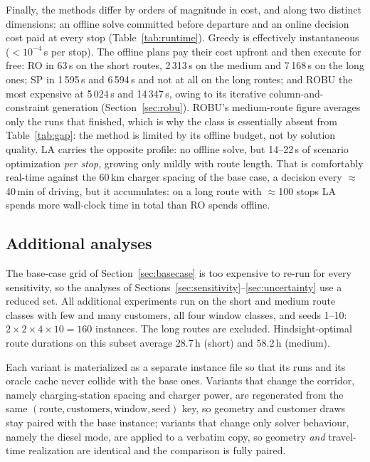Finally, the methods differ by orders of magnitude in cost, and along two
distinct dimensions: an offline solve committed before departure and an online
decision cost paid at every stop (Table~\ref{tab:runtime}).  Greedy is
effectively instantaneous ($<10^{-4}$\,s per stop).  The offline plans pay their
cost upfront and then execute for free: RO in 63\,s on the short routes,
2\,313\,s on the medium and 7\,168\,s on the long ones; SP in 1\,595\,s and
6\,594\,s and not at all on the long routes; and ROBU the most expensive at
5\,024\,s and 14\,347\,s, owing to its iterative column-and-constraint
generation (Section~\ref{sec:robu}).  ROBU's medium-route figure averages only
the runs that finished, which is why the class is essentially absent from
Table~\ref{tab:gap}: the method is limited by its offline budget, not by
solution quality.  LA carries the opposite profile: no offline solve, but
14--22\,s of scenario optimization \emph{per stop}, growing only mildly with
route length.  That is comfortably real-time against the 60\,km charger spacing
of the base case, a decision every $\approx$40\,min of driving, but it
accumulates: on a long route with $\approx$100 stops LA spends more wall-clock
time in total than RO spends offline.


\subsection{Additional analyses}
\label{sec:additional-protocol}

The base-case grid of Section~\ref{sec:basecase} is too expensive to re-run for
every sensitivity, so the analyses of
Sections~\ref{sec:sensitivity}--\ref{sec:uncertainty} use a reduced set.  All
additional experiments run on the short and medium route classes with few and
many customers, all four window classes, and seeds 1--10:
$2 \times 2 \times 4 \times 10 = 160$ instances.  The long routes are excluded.
Hindsight-optimal route durations on this subset average 28.7\,h (short) and
58.2\,h (medium).

Each variant is materialized as a separate instance file so that its runs and
its oracle cache never collide with the base ones.  Variants that change the
corridor, namely charging-station spacing and charger power, are regenerated
from the same $(\text{route}, \text{customers}, \text{window}, \text{seed})$
key, so geometry and customer draws stay paired with the base instance;
variants that change only solver behaviour, namely the diesel mode, are applied
to a verbatim copy, so geometry \emph{and} travel-time realization are
identical and the comparison is fully paired.

